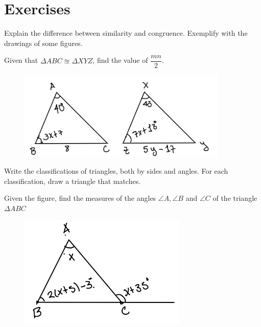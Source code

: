 \section{\large Exercises}

\begin{exer}
    Explain the difference between similarity and congruence.
    Exemplify with the drawings of some figures.
\end{exer}

 \vspace{5cm}

\begin{exer}
    Given that $\Delta ABC \approxeq \Delta XYZ$, find the value of $\dfrac{mn}{2}$.
    \begin{figure}[H]
        \center
        \includegraphics[width=10cm]{content/img1.png}
    \end{figure}
\end{exer}
\newpage

\begin{exer}
    Write the classifications of triangles, both by sides and angles.
    For each classification, draw a triangle that matches.
\end{exer}

\vspace{8cm}

\begin{exer}
    Given the figure, find the measures of the angles $\angle A, \angle B$ and $\angle C$ of the triangle $\Delta ABC$
    \begin{figure}[H]
        \center
        \includegraphics[width=8cm]{content/img2.png}
    \end{figure}
\end{exer}